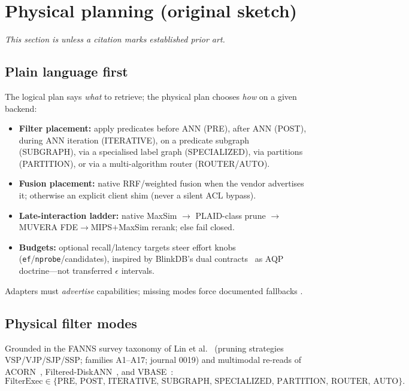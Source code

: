 \section{Physical planning (original sketch)}
\label{sec:optimizer}

\noindent\textit{This section is \hypothesis{} unless a citation marks established prior art.}

\subsection{Plain language first}
The logical plan says \emph{what} to retrieve; the physical plan chooses \emph{how} on a given backend:
\begin{itemize}[leftmargin=*]
  \item \textbf{Filter placement:} apply predicates before ANN (PRE), after ANN (POST), during ANN iteration (ITERATIVE), on a predicate subgraph (SUBGRAPH), via a specialised label graph (SPECIALIZED), via partitions (PARTITION), or via a multi-algorithm router (ROUTER/AUTO).
  \item \textbf{Fusion placement:} native RRF/weighted fusion when the vendor advertises it; otherwise an explicit client shim (never a silent ACL bypass).
  \item \textbf{Late-interaction ladder:} native MaxSim $\rightarrow$ PLAID-class prune $\rightarrow$ MUVERA FDE$\rightarrow$MIPS$+$MaxSim rerank; else fail closed.
  \item \textbf{Budgets:} optional recall/latency targets steer effort knobs (\texttt{ef}/\texttt{nprobe}/candidates), inspired by BlinkDB's dual contracts~\citep{agarwal2013blinkdb} \established{} as AQP doctrine---not transferred $\epsilon$ intervals.
\end{itemize}
Adapters must \emph{advertise} capabilities; missing modes force documented fallbacks \hypothesis{}.

\subsection{Physical filter modes}
\label{sec:filterexec}
Grounded in the FANNS survey taxonomy of Lin et al.~\citep{lin2025fanns} (pruning strategies VSP/VJP/SJP/SSP; families A1--A17; journal 0019) and multimodal re-reads of ACORN~\citep{patel2024acorn}, Filtered-DiskANN~\citep{gollapudi2023filtered}, and VBASE~\citep{zhang2023vbase}:
\[
\mathrm{FilterExec}\in\{\mathrm{PRE},\,\mathrm{POST},\,\mathrm{ITERATIVE},\,\mathrm{SUBGRAPH},\,\mathrm{SPECIALIZED},\,\mathrm{PARTITION},\,\mathrm{ROUTER},\,\mathrm{AUTO}\}.
\]
